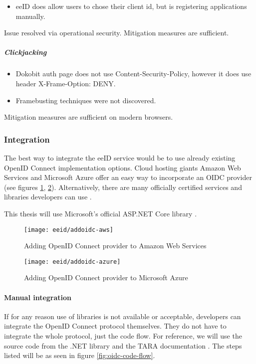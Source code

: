 \begin{itemize}
  \item eeID does allow users to chose their client id, but is registering applications manually.
\end{itemize}

Issue resolved via operational security. Mitigation measures are sufficient.

\subparagraph{Clickjacking}

\begin{itemize}
  \item Dokobit auth page does not use Content-Security-Policy, however it does use header X-Frame-Option: {DENY}.
  \item Framebusting \cite{RYDSTEDT2010BUSTI} techniques were not discovered.
\end{itemize}

Mitigation measures are sufficient on modern browsers.

\subsubsection{Integration}

The best way to integrate the eeID service would be to use already existing OpenID Connect implementation options. Cloud hosting giants Amazon Web Services and Microsoft Azure offer an easy way to incorporate an OIDC provider (see figures \ref{fig:addoidc-aws}, \ref{fig:addoidc-azure}). Alternatively, there are many officially certified services and libraries developers can use \cite{oidc-certified}.

This thesis will use Microsoft's official ASP.NET Core library \cite{ms-auth-oidc-src}.

\begin{figure}
  \centering
  \texttt{[image: eeid/addoidc-aws]}
  \caption{Adding OpenID Connect provider to Amazon Web Services}
  \label{fig:addoidc-aws}
\end{figure}

\begin{figure}
  \centering
  \texttt{[image: eeid/addoidc-azure]}
  \caption{Adding OpenID Connect provider to Microsoft Azure}
  \label{fig:addoidc-azure}
\end{figure}

\paragraph{Manual integration} If for any reason use of libraries is not available or acceptable, developers can integrate the OpenID Connect protocol themselves. They do not have to integrate the whole protocol, just the code flow. For reference, we will use the source code from the {.NET} library \cite{ms-auth-oidc-src} and the TARA documentation \cite{tara-technical}. The steps listed will be as seen in figure \ref{fig:oidc-code-flow}.

